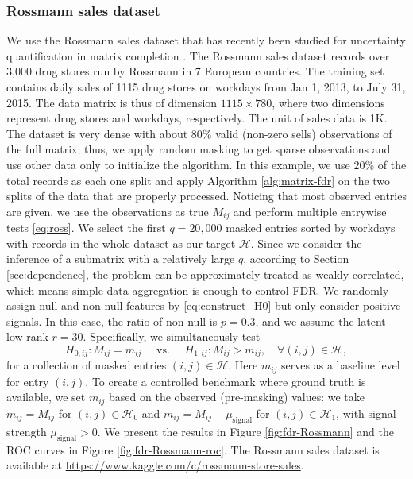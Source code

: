 \documentclass[12pt]{article}
\newcommand{\cH}{\mathcal{H}}
\theoremstyle{plain}
\begin{document}
\begin{sloppypar}
\subsubsection{Rossmann sales dataset}
We use the Rossmann sales dataset that has recently been studied for uncertainty quantification in matrix completion \citep{farias2022uncertainty,gui2023conformalized}. The Rossmann sales dataset records over 3,000 drug stores run by Rossmann in 7 European countries. The training set contains daily sales of 1115 drug stores on workdays from Jan 1, 2013, to July 31, 2015. The data matrix is thus of dimension $1115\times780$, where two dimensions represent drug stores and workdays, respectively. The unit of sales data is 1K. The dataset is very dense with about $80\%$ valid (non-zero sells) observations of the full matrix; thus, we apply random masking to get sparse observations and use other data only to initialize the algorithm. In this example, we use $20\%$ of the total records as each one split and apply Algorithm \ref{alg:matrix-fdr} on the two splits of the data that are properly processed. Noticing that most observed entries are given, we use the observations as true $M_{ij}$ and perform multiple entrywise tests \eqref{eq:ross}. We select the first $q=20,000$ masked entries sorted by workdays with records in the whole dataset as our target $\cH$.
Since we consider the inference of a submatrix with a relatively large $q$, according to Section \ref{sec:dependence}, the problem can be approximately treated as weakly correlated, which means simple data aggregation is enough to control FDR. We randomly assign null and non-null features by \eqref{eq:construct_H0} but only consider positive signals. In this case, the ratio of non-null is $p=0.3$, and we assume the latent low-rank $r=30$. Specifically, we simultaneously test
\begin{equation}\label{eq:ross}
      H_{0,ij}: M_{ij}=m_{ij}\quad \text{ vs. } \quad H_{1,ij}: M_{ij}> m_{ij}, \quad \forall (i,j)\in \cH,
\end{equation}
for a collection of masked entries $(i,j)\in\cH$. Here $m_{ij}$ serves as a baseline level for entry $(i,j)$. To create a controlled benchmark where ground truth is available, we set $m_{ij}$ based on the observed (pre-masking) values: we take $m_{ij}=M_{ij}$ for $(i,j)\in\cH_0$ and $m_{ij}=M_{ij}-\mu_{\operatorname{signal}}$ for $(i,j)\in\cH_1$, with signal strength $\mu_{\operatorname{signal}}>0$.
We present the results in Figure \ref{fig:fdr-Rossmann} and the ROC curves in Figure \ref{fig:fdr-Rossmann-roc}. The Rossmann sales dataset is available at \url{https://www.kaggle.com/c/rossmann-store-sales}.



\end{sloppypar}
\end{document}
